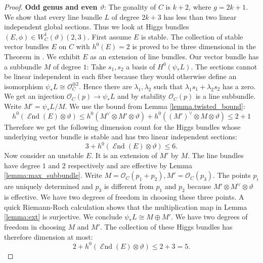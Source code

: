 \documentclass[12pt]{extarticle}
\theoremstyle{definition}
\numberwithin{theorem}{section}
\newcommand{\OO}{\mathcal{O}}
\DeclareMathOperator{\End}{\mathcal{E}nd}
\begin{document}
\begin{proof}
\textbf{Odd genus and even $\vartheta$}:
The gonality of $C$ is $k +2$, where $g = 2k+1$. We show that every line bundle $L$ of degree $2k +3$ has less than two linear independent global sections. Thus we look at Higgs bundles $(E,\phi)  \in W^1_C(\vartheta)(2,3)$. First assume $E$ is stable. The collection of stable vector bundles $E$ on $C$ with $h^0(E) = 2$ is proved to be three dimensional in the Theorem in \cite{Teixidor}. We exhibit $E$ as an extension of line bundles. Our vector bundle has a subbundle $M$ of degree $1$: Take $s_1,s_2 $ a basis of $H^0(\psi_*L)$. The sections cannot be linear independent in each fiber because they would otherwise define an isomorphism $\psi_*L \cong \OO_C^{\oplus 2}$. Hence there are $\lambda_1,\lambda_2$ such that $\lambda_1s_1 + \lambda_2s_2$ has a zero. We get an injection $\OO_C(p) \rightarrow \psi_*L$ and by stability $\OO_C(p)$ is a line subbundle. Write $M' = \psi_*L/M$. We use the bound from Lemma \ref{lemma.twisted_bound}:
\begin{equation*}
h^0(\End(E)\otimes \vartheta) \leq h^0(M^\vee \otimes M' \otimes \vartheta) + h^0((M')^\vee \otimes M \otimes \vartheta) \leq 2 +1 
\end{equation*}
Therefore we get the following dimension count for the Higgs bundles whose underlying vector bundle is stable and has two linear independent sections:
\begin{equation}
3 + h^0(\End(E)\otimes \vartheta) \leq 6.
\end{equation} 
Now consider an unstable $E$. It is an extension of $M'$ by $M$. The line bundles have degree $1$ and $2$ respectively and are effective by Lemma \ref{lemma:max_subbundle}.  Write $M = \OO_C(p_1 + p_2), M' = \OO_C(p_3)$. The points $p_i$ are uniquely determined and $p_3$ is different from $p_1$ and $p_2$ because $M' \otimes M^\vee \otimes \vartheta$ is effective. We have two degrees of freedom in choosing these three points. A quick Riemann-Roch calculation shows that the multiplication map in Lemma \ref{lemma:ext} is surjective. We conclude $\psi_*L \cong M \oplus M'$. We have two degrees of freedom in choosing $M$ and $M'$. The collection of these Higgs bundles has therefore dimension at most:
\begin{equation}
2 + h^0(\End(E) \otimes \vartheta) \leq 2 + 3  = 5. 
\end{equation}
\medskip


\end{proof}
\end{document}
